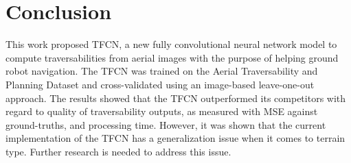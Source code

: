 \documentclass[conference]{IEEEtran}
\begin{document}
\section{Conclusion}
\label{section:conclusion}

This work proposed TFCN, a new fully convolutional neural network model to compute traversabilities from aerial images with the purpose of helping ground robot navigation.
The TFCN was trained on the Aerial Traversability and Planning Dataset and cross-validated using an image-based leave-one-out approach.
The results showed that the TFCN outperformed its competitors with regard to quality of traversability outputs, as measured with MSE against ground-truths, and processing time.
However, it was shown that the current implementation of the TFCN has a generalization issue when it comes to terrain type.
Further research is needed to address this issue.




\end{document}
